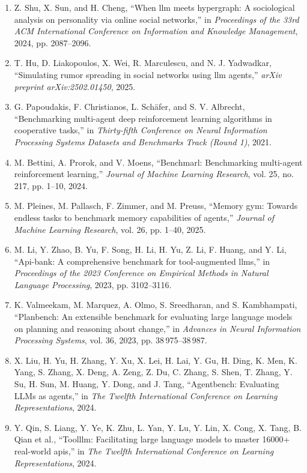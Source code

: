 \documentclass[10pt,UTF8,fontset=fandol]{ctexart}
\begin{document}
\begin{enumerate}[leftmargin=2.4em,labelsep=0.4em,itemsep=0.15em]
\item Z. Shu, X. Sun, and H. Cheng, ``When llm meets hypergraph: A sociological analysis on personality via online social networks,'' in \textit{Proceedings of the 33rd ACM International Conference on Information and Knowledge Management}, 2024, pp. 2087--2096.
\item T. Hu, D. Liakopoulos, X. Wei, R. Marculescu, and N. J. Yadwadkar, ``Simulating rumor spreading in social networks using llm agents,'' \textit{arXiv preprint arXiv:2502.01450}, 2025.
\item G. Papoudakis, F. Christianos, L. Schäfer, and S. V. Albrecht, ``Benchmarking multi-agent deep reinforcement learning algorithms in cooperative tasks,'' in \textit{Thirty-fifth Conference on Neural Information Processing Systems Datasets and Benchmarks Track (Round 1)}, 2021.
\item M. Bettini, A. Prorok, and V. Moens, ``Benchmarl: Benchmarking multi-agent reinforcement learning,'' \textit{Journal of Machine Learning Research}, vol. 25, no. 217, pp. 1--10, 2024.
\item M. Pleines, M. Pallasch, F. Zimmer, and M. Preuss, ``Memory gym: Towards endless tasks to benchmark memory capabilities of agents,'' \textit{Journal of Machine Learning Research}, vol. 26, pp. 1--40, 2025.
\item M. Li, Y. Zhao, B. Yu, F. Song, H. Li, H. Yu, Z. Li, F. Huang, and Y. Li, ``Api-bank: A comprehensive benchmark for tool-augmented llms,'' in \textit{Proceedings of the 2023 Conference on Empirical Methods in Natural Language Processing}, 2023, pp. 3102--3116.
\item K. Valmeekam, M. Marquez, A. Olmo, S. Sreedharan, and S. Kambhampati, ``Planbench: An extensible benchmark for evaluating large language models on planning and reasoning about change,'' in \textit{Advances in Neural Information Processing Systems}, vol. 36, 2023, pp. 38\,975--38\,987.
\item X. Liu, H. Yu, H. Zhang, Y. Xu, X. Lei, H. Lai, Y. Gu, H. Ding, K. Men, K. Yang, S. Zhang, X. Deng, A. Zeng, Z. Du, C. Zhang, S. Shen, T. Zhang, Y. Su, H. Sun, M. Huang, Y. Dong, and J. Tang, ``Agentbench: Evaluating LLMs as agents,'' in \textit{The Twelfth International Conference on Learning Representations}, 2024.
\item Y. Qin, S. Liang, Y. Ye, K. Zhu, L. Yan, Y. Lu, Y. Lin, X. Cong, X. Tang, B. Qian et al., ``Toolllm: Facilitating large language models to master 16000+ real-world apis,'' in \textit{The Twelfth International Conference on Learning Representations}, 2024.

\end{enumerate}
\end{document}
